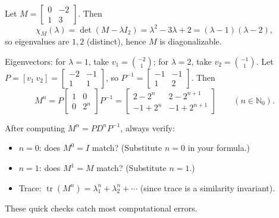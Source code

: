 \begin{examplebox}[title={Worked Example (Lecture Week 9): explicit formula for $\begin{bmatrix}0&-2\\1&3\end{bmatrix}^n$}]
Let $M=\begin{bmatrix}0&-2\\1&3\end{bmatrix}$. Then
\[
\chi_M(\lambda)=\det(M-\lambda I_2)=\lambda^2-3\lambda+2=(\lambda-1)(\lambda-2),
\]
so eigenvalues are $1,2$ (distinct), hence $M$ is diagonalizable.

Eigenvectors: for $\lambda=1$, take $v_1=\binom{-2}{1}$; for $\lambda=2$, take $v_2=\binom{-1}{1}$.
Let $P=[v_1\ v_2]=\begin{bmatrix}-2&-1\\1&1\end{bmatrix}$, so $P^{-1}=\begin{bmatrix}-1&-1\\1&2\end{bmatrix}$.
Then
\[
M^n=P\begin{bmatrix}1&0\\0&2^n\end{bmatrix}P^{-1}
=
\begin{bmatrix}
2-2^n & 2-2^{n+1}\\
-1+2^n & -1+2^{n+1}
\end{bmatrix}
\qquad(n\in\mathbb{N}_0).
\]
\end{examplebox}

\begin{examtip}[title={Exam Focus: sanity-checking $M^n = PD^nP^{-1}$}]
After computing $M^n=PD^nP^{-1}$, always verify:
\begin{itemize}
\item $n=0$: does $M^0 = I$ match? (Substitute $n=0$ in your formula.)
\item $n=1$: does $M^1 = M$ match? (Substitute $n=1$.)
\item Trace: $\operatorname{tr}(M^n) = \lambda_1^n + \lambda_2^n + \cdots$ (since trace is a similarity invariant).
\end{itemize}
These quick checks catch most computational errors.
\end{examtip}

